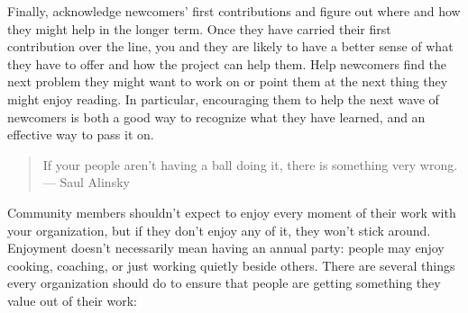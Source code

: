 Finally,
acknowledge newcomers' first contributions
and figure out where and how they might help in the longer term.
Once they have carried their first contribution over the line,
you and they are likely to have a better sense of what they have to offer
and how the project can help them.
Help newcomers find the next problem they might want to work on
or point them at the next thing they might enjoy reading.
In particular,
encouraging them to help the next wave of newcomers
is both a good way to recognize what they have learned,
and an effective way to pass it on.


\begin{quote}

  If your people aren't having a ball doing it, there is something very wrong.\\
  --- Saul Alinsky

\end{quote}

Community members shouldn't expect to enjoy every moment of their work with your organization,
but if they don't enjoy any of it,
they won't stick around.
Enjoyment doesn't necessarily mean having an annual party:
people may enjoy cooking,
coaching,
or just working quietly beside others.
There are several things every organization should do to ensure
that people are getting something they value out of their work:

